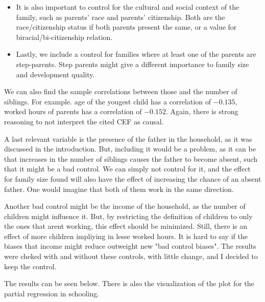 \documentclass[12pt]{article}
\begin{document}
\begin{itemize}
\begin{itemize}
        \item It is also important to control for the cultural and social context of the family, such as parents' race and parents' citizenship. Both are the race/citizenship status if both parents present the same, or a value for biracial/bi-citizenship relation.
        \item Lastly, we include a control for families where at least one of the parents are step-parents. Step parents might give a different importance to family size and development quality.
    \end{itemize}
\end{itemize}

We can also find the sample correlations between those and the number of siblings. For example. age of the yougest child has a correlation of $-0.135$, worked hours of parents has a correlation of $-0.152$. Again, there is strong reasoning to not interpret the cited CEF as causal.

A last relevant variable is the presence of the father in the household, as it was discussed in the introduction. But, including it would be a problem, as it can be that increases in the number of siblings causes the father to become absent, such that it might be a bad control. We can simply not control for it, and the effect for family size found will also have the effect of increasing the chance of an absent father. One would imagine that both of them work in the same direction.

Another bad control might be the income of the household, as the number of children might influence it. But, by restricting the definition of children to only the ones that arent working, this effect should be minimized. Still, there is an effect of more children impliying in lesse worked hours. It is hard to say if the biases that income might reduce outweight new "bad control biases". The results were cheked with and without these controls, with little change, and I decided to keep the control.

The results can be seen below. There is also the visualization of the plot for the partial regression in schooling.


\end{document}
